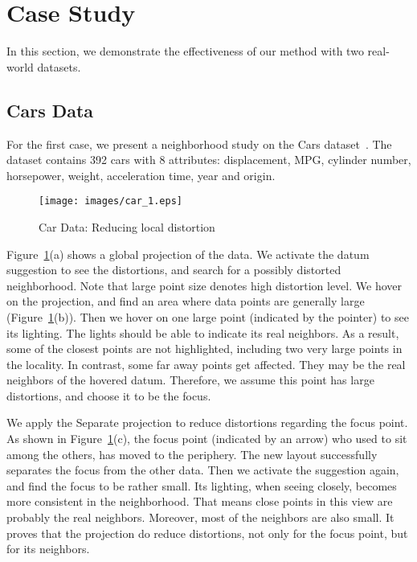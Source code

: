 \section{Case Study}
\label{section:casestudy}
In this section, we demonstrate the effectiveness of our method with two real-world datasets.

\subsection{Cars Data}
For the first case, we present a neighborhood study on the Cars dataset~\cite{Lichman:2013}. The dataset contains 392 cars with 8 attributes: displacement, MPG, cylinder number, horsepower, weight, acceleration time, year and origin.

\begin{figure}[htbp]
\centering
  \texttt{[image: images/car\_1.eps]}%
  \caption{Car Data: Reducing local distortion}
\label{fig:car}
  \end{figure}

Figure~\ref{fig:car}(a) shows a global projection of the data. We activate the datum suggestion to see the distortions, and search for a possibly distorted neighborhood. Note that large point size denotes high distortion level. We hover on the projection, and find an area where data points are generally large (Figure~\ref{fig:car}(b)). Then we hover on one large point (indicated by the pointer) to see its lighting. The lights should be able to indicate its real neighbors. As a result, some of the closest points are not highlighted, including two very large points in the locality. In contrast, some far away points get affected. They may be the real neighbors of the hovered datum. Therefore, we assume this point has large distortions, and choose it to be the focus.

We apply the Separate projection to reduce distortions regarding the focus point. As shown in Figure~\ref{fig:car}(c), the focus point (indicated by an arrow) who used to sit among the others, has moved to the periphery. The new layout successfully separates the focus from the other data. Then we activate the suggestion again, and find the focus to be rather small. Its lighting, when seeing closely, becomes more consistent in the neighborhood. That means close points in this view are probably the real neighbors. Moreover, most of the neighbors are also small. It proves that the projection do reduce distortions, not only for the focus point, but for its neighbors.

